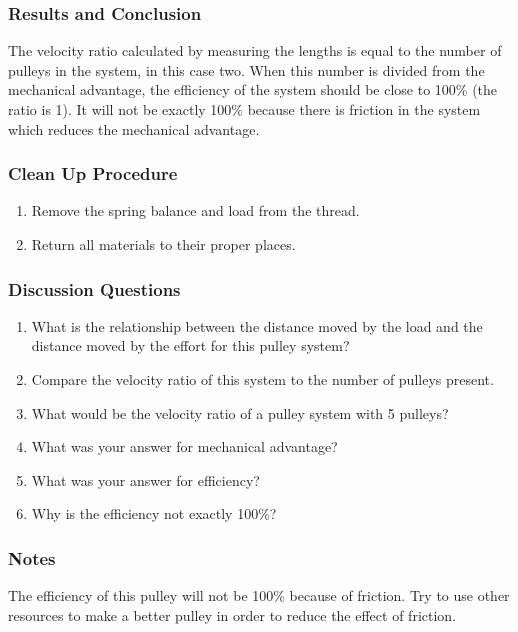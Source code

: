 \subsubsection*{Results and Conclusion}
The velocity ratio calculated by measuring the lengths is equal to the number of pulleys in the system, in this case two.  When this number is divided from the mechanical advantage, the efficiency of the system should be close to 100\% (the ratio is 1).  It will not be exactly 100\% because there is friction in the system which reduces the mechanical advantage.

\subsubsection*{Clean Up Procedure}
\begin{enumerate}
\item{Remove the spring balance and load from the thread.}
\item{Return all materials to their proper places.}
\end{enumerate}

\subsubsection*{Discussion Questions}
\begin{enumerate}
\item{What is the relationship between the distance moved by the load and the distance moved by the effort for this pulley system?}
\item{Compare the velocity ratio of this system to the number of pulleys present.}
\item{What would be the velocity ratio of a pulley system with 5 pulleys?}
\item{What was your answer for mechanical advantage?}
\item{What was your answer for efficiency?}
\item{Why is the efficiency not exactly 100\%?}
\end{enumerate}

\subsubsection*{Notes}
The efficiency of this pulley will not be 100\% because of friction.  Try to use other resources to make a better pulley in order to reduce the effect of friction.
